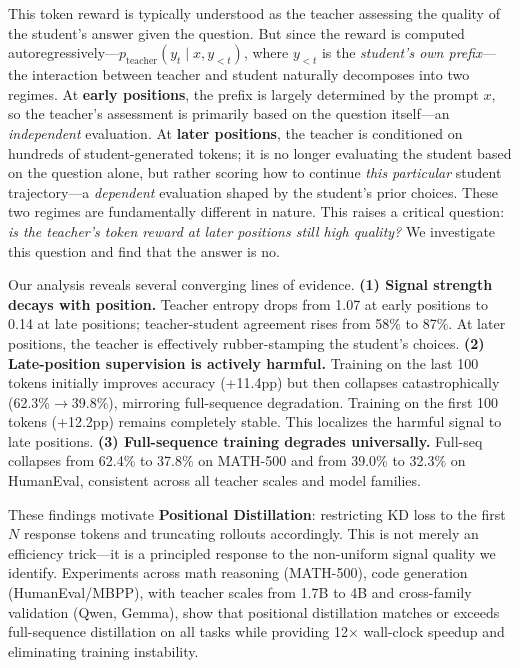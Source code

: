 \documentclass[10pt]{article}
\newcommand{\methodfull}{Positional Distillation}
\begin{document}
This token reward is typically understood as the teacher assessing the quality of the student's answer given the question. But since the reward is computed autoregressively---$p_\text{teacher}(y_t \mid x, y_{<t})$, where $y_{<t}$ is the \emph{student's own prefix}---the interaction between teacher and student naturally decomposes into two regimes. At \textbf{early positions}, the prefix is largely determined by the prompt $x$, so the teacher's assessment is primarily based on the question itself---an \emph{independent} evaluation. At \textbf{later positions}, the teacher is conditioned on hundreds of student-generated tokens; it is no longer evaluating the student based on the question alone, but rather scoring how to continue \emph{this particular} student trajectory---a \emph{dependent} evaluation shaped by the student's prior choices. These two regimes are fundamentally different in nature. This raises a critical question: \emph{is the teacher's token reward at later positions still high quality?} We investigate this question and find that the answer is no.

Our analysis reveals several converging lines of evidence. \textbf{(1) Signal strength decays with position.} Teacher entropy drops from 1.07 at early positions to 0.14 at late positions; teacher-student agreement rises from 58\% to 87\%. At later positions, the teacher is effectively rubber-stamping the student's choices. \textbf{(2) Late-position supervision is actively harmful.} Training on the last 100 tokens initially improves accuracy (+11.4pp) but then collapses catastrophically (62.3\%$\to$39.8\%), mirroring full-sequence degradation. Training on the first 100 tokens (+12.2pp) remains completely stable. This localizes the harmful signal to late positions. \textbf{(3) Full-sequence training degrades universally.} Full-seq collapses from 62.4\% to 37.8\% on MATH-500 and from 39.0\% to 32.3\% on HumanEval, consistent across all teacher scales and model families.

These findings motivate \textbf{\methodfull{}}: restricting KD loss to the first $N$ response tokens and truncating rollouts accordingly. This is not merely an efficiency trick---it is a principled response to the non-uniform signal quality we identify. Experiments across math reasoning (MATH-500), code generation (HumanEval/MBPP), with teacher scales from 1.7B to 4B and cross-family validation (Qwen, Gemma), show that positional distillation matches or exceeds full-sequence distillation on all tasks while providing 12$\times$ wall-clock speedup and eliminating training instability.
\end{document}
